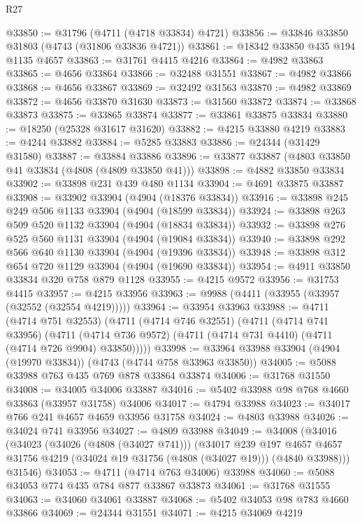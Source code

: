 \begin{lexlean}{R27}
\begin{coremodule}
@33850 := @31796 (@4711 (@4718 @33834) @4721)
@33856 := @33846 @33850 @31803 (@4743 (@31806 @33836 @4721))
@33861 := @18342 @33850 @435 @194 @1135 @4657
@33863 := @31761 @4415 @4216
@33864 := @4982 @33863
@33865 := @4656 @33864
@33866 := @32488 @31551
@33867 := @4982 @33866
@33868 := @4656 @33867
@33869 := @32492 @31563
@33870 := @4982 @33869
@33872 := @4656 @33870 @31630
@33873 := @31560 @33872
@33874 := @33868 @33873
@33875 := @33865 @33874
@33877 := @33861 @33875 @33834
@33880 := @18250 (@25328 @31617 @31620)
@33882 := @4215 @33880 @4219
@33883 := @4244 @33882
@33884 := @5285 @33883
@33886 := @24344 (@31429 @31580)
@33887 := @33884 @33886
@33896 := @33877 @33887 (@4803 @33850 @41 @33834 (@4808 (@4809 @33850 @41)))
@33898 := @4882 @33850 @33834
@33902 := @33898 @231 @439 @480 @1134
@33904 := @4691 @33875 @33887
@33908 := @33902 @33904 (@4904 (@18376 @33834))
@33916 := @33898 @245 @249 @506 @1133 @33904 (@4904 (@18599 @33834))
@33924 := @33898 @263 @509 @520 @1132 @33904 (@4904 (@18834 @33834))
@33932 := @33898 @276 @525 @560 @1131 @33904 (@4904 (@19084 @33834))
@33940 := @33898 @292 @566 @640 @1130 @33904 (@4904 (@19396 @33834))
@33948 := @33898 @312 @654 @720 @1129 @33904 (@4904 (@19690 @33834))
@33954 := @4911 @33850 @33834 @320 @758 @879 @1128
@33955 := @4215 @9572
@33956 := @31753 @4415
@33957 := @4215 @33956
@33963 := @9988 (@4411 (@33955 (@33957 (@32552 (@32554 @4219)))))
@33964 := @33954 @33963
@33988 := @4711
    (@4714 @751 @32553)
    (@4711
      (@4714 @746 @32551)
      (@4711
        (@4714 @741 @33956)
        (@4711 (@4714 @736 @9572) (@4711 (@4714 @731 @4410) (@4711 (@4714 @726 @9904) @33850)))))
@33998 := @33964 @33988 @33904 (@4904 (@19970 @33834)) (@4743 (@4744 @758 @33963 @33850))
@34005 := @5088 @33988 @763 @435 @769 @878 @33864 @33874
@34006 := @31768 @31550
@34008 := @34005 @34006 @33887
@34016 := @5402 @33988 @98 @768 @4660 @33863 (@33957 @31758) @34006
@34017 := @4794 @33988
@34023 := @34017 @766 @241 @4657 @4659 @33956 @31758
@34024 := @4803 @33988
@34026 := @34024 @741 @33956
@34027 := @4809 @33988
@34049 := @34008
    (@34016
      (@34023
        (@34026 (@4808 (@34027 @741)))
        (@34017
          @239
          @197
          @4657
          @4657
          @31756
          @4219
          (@34024 @19 @31756 (@4808 (@34027 @19)))
          (@4840 @33988)))
      @31546)
@34053 := @4711 (@4714 @763 @34006) @33988
@34060 := @5088 @34053 @774 @435 @784 @877 @33867 @33873
@34061 := @31768 @31555
@34063 := @34060 @34061 @33887
@34068 := @5402 @34053 @98 @783 @4660 @33866
@34069 := @24344 @31551
@34071 := @4215 @34069 @4219

\end{coremodule}
\end{lexlean}
